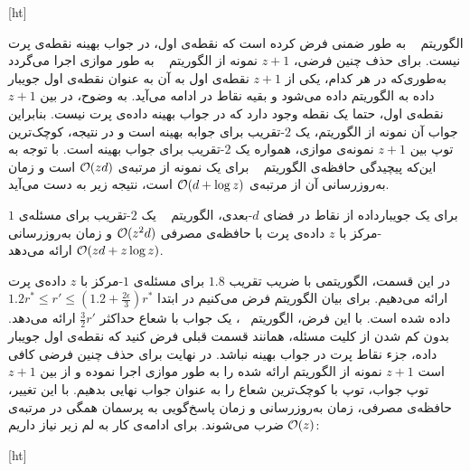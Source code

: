 


[ht]

الگوریتم ~ به طور ضمنی فرض کرده است که نقطه‌ی اول، در جواب بهینه نقطه‌ی پرت نیست. برای حذف چنین فرضی، $z+1$ نمونه از الگوریتم ~ به طور موازی اجرا می‌گردد به‌طوری‌که در هر کدام، یکی از $z+1$ نقطه‌ی اول به آن به عنوان نقطه‌ی اول جویبار داده به الگوریتم داده می‌شود و بقیه نقاط در ادامه می‌آید. به وضوح، در بین $z+1$ نقطه‌ی اول، حتما یک نقطه‌ وجود دارد که در جواب بهینه داده‌ی پرت نیست. بنابراین جواب آن نمونه از الگوریتم، یک $2$-تقریب برای جوابه بهینه است و در نتیجه، کوچک‌ترین توپ بین $z+1$ نمونه‌ی موازی، همواره یک $2$-تقریب برای جواب بهینه است. با توجه به این‌که پیچیدگی حافظه‌ی الگوریتم ~ برای یک نمونه از مرتبه‌ی $\mathcal{O}(zd)$ است و زمان به‌روزرسانی‌ آن از مرتبه‌ی $\mathcal{O}(d + \log{z})$ است، نتیجه زیر به دست می‌آید. 

برای یک جویبار‌داده از نقاط در فضای $d$-بعدی، الگوریتم ~ یک $2$-تقریب برای مسئله‌ی $1$-مرکز با $z$ داده‌ی پرت با حافظه‌ی مصرفی $\mathcal{O}(z^2d)$ و زمان به‌روزرسانی $\mathcal{O}(zd + z\log{z})$ ارائه می‌دهد.



در این قسمت، الگوریتمی با ضریب تقریب $1.8$ برای مسئله‌ی $1$-مرکز با $z$ داده‌ی پرت ارائه می‌دهیم. برای بیان الگوریتم فرض می‌کنیم در ابتدا $1.2r^* \leq r' \leq (1.2 + \frac{2\epsilon}{3})r^*$ داده شده است. با این فرض، الگوریتم ~، یک جواب با شعاع حداکثر $\frac{3}{2}r'$ ارائه می‌دهد. بدون کم شدن از کلیت مسئله، همانند قسمت قبلی فرض کنید که نقطه‌ی اول جویبار داده، جزء نقاط پرت در جواب بهینه نباشد. در نهایت برای حذف چنین فرضی کافی است $z+1$ نمونه از الگوریتم ارائه شده را به طور موازی اجرا نموده و از بین $z+1$ توپ جواب، توپ با کوچک‌ترین شعاع را به عنوان جواب نهایی بدهیم. با این تغییر، حافظه‌ی مصرفی، زمان به‌روزرسانی و زمان پاسخ‌گویی به پرسمان همگی در مرتبه‌ی $\mathcal{O}(z)$ ضرب می‌شوند. برای ادامه‌ی کار به لم زیر نیاز داریم:

[ht]


